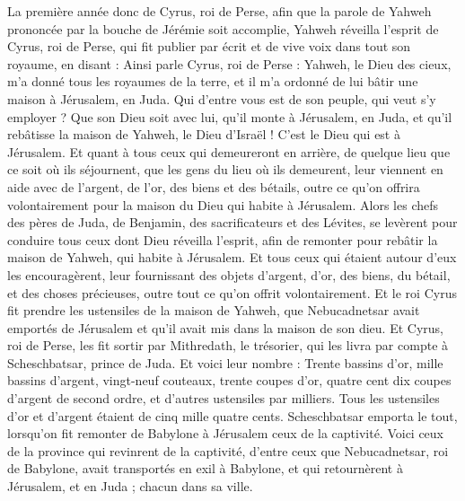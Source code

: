 \begin{multicols}{2}
\VerseOne{}La première année donc de Cyrus, roi de Perse, afin que la parole de Yahweh prononcée par la bouche de Jérémie soit accomplie, Yahweh réveilla l'esprit de Cyrus, roi de Perse, qui fit publier par écrit et de vive voix dans tout son royaume, en disant :
Ainsi parle Cyrus, roi de Perse : Yahweh, le Dieu des cieux, m'a donné tous les royaumes de la terre, et il m'a ordonné de lui bâtir une maison à Jérusalem, en Juda.
Qui d'entre vous est de son peuple, qui veut s'y employer ? Que son Dieu soit avec lui, qu'il monte à Jérusalem, en Juda, et qu'il rebâtisse la maison de Yahweh, le Dieu d'Israël ! C'est le Dieu qui est à Jérusalem.
Et quant à tous ceux qui demeureront en arrière, de quelque lieu que ce soit où ils séjournent, que les gens du lieu où ils demeurent, leur viennent en aide avec de l'argent, de l'or, des biens et des bétails, outre ce qu'on offrira volontairement pour la maison du Dieu qui habite à Jérusalem.
Alors les chefs des pères de Juda, de Benjamin, des sacrificateurs et des Lévites, se levèrent pour conduire tous ceux dont Dieu réveilla l'esprit, afin de remonter pour rebâtir la maison de Yahweh, qui habite à Jérusalem.
Et tous ceux qui étaient autour d'eux les encouragèrent, leur fournissant des objets d'argent, d'or, des biens, du bétail, et des choses précieuses, outre tout ce qu'on offrit volontairement.
Et le roi Cyrus fit prendre les ustensiles de la maison de Yahweh, que Nebucadnetsar avait emportés de Jérusalem et qu'il avait mis dans la maison de son dieu.
Et Cyrus, roi de Perse, les fit sortir par Mithredath, le trésorier, qui les livra par compte à Scheschbatsar, prince de Juda.
Et voici leur nombre : Trente bassins d'or, mille bassins d'argent, vingt-neuf couteaux,
trente coupes d'or, quatre cent dix coupes d'argent de second ordre, et d'autres ustensiles par milliers.
Tous les ustensiles d'or et d'argent étaient de cinq mille quatre cents. Scheschbatsar emporta le tout, lorsqu'on fit remonter de Babylone à Jérusalem ceux de la captivité.
\VerseOne{}Voici ceux de la province qui revinrent de la captivité, d'entre ceux que Nebucadnetsar, roi de Babylone, avait transportés en exil à Babylone, et qui retournèrent à Jérusalem, et en Juda ; chacun dans sa ville.

\end{multicols}

